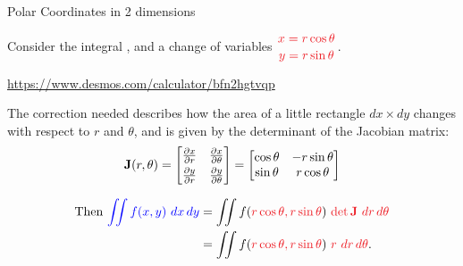 \documentclass[xcolor=dvipsnames,aspectratio=169,t]{beamer}
\begin{document}
\begin{frame}{Polar Coordinates in 2 dimensions}
  \bigskip
  
  Consider the integral , 
  and a change of variables $\displaystyle\colorr{{x=r \cos \theta} \atop {y=r \sin \theta}}$.
  \smallskip
  
  \url{https://www.desmos.com/calculator/bfn2hgtvqp}
  \medskip
  
  \pause
  The correction needed describes how the area of a little rectangle $dx \times dy$ changes with respect to $r$ and $\theta$, and is given by the determinant of the \alert{Jacobian matrix}:
  \[
    \displaystyle
    \mathbf{J}(r,\theta)
      =\begin{bmatrix}
        \frac{\partial x}{\partial r} & \frac{\partial x}{\partial \theta} \smallskip\\
        \frac{\partial y}{\partial r} & \frac{\partial y}{\partial \theta}
       \end{bmatrix}
      =\begin{bmatrix}
        \cos \theta & -r \sin\theta \\
        \sin \theta &  r \cos\theta
       \end{bmatrix}
  \]

  \pause
  \begin{align*}
    \text{Then } \colorb{\iint f(x,y) \ dx\,dy}
      &=\iint f(\colorr{r\cos\theta,r\sin\theta}) \ \colorr{\det \mathbf{J}\ dr\, d\theta} \\
      &=\iint f(\colorr{r\cos\theta,r\sin\theta}) \ \colorr{r \ dr\, d\theta}.
  \end{align*}
\end{frame}
\end{document}
